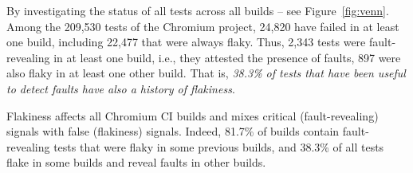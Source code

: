 By investigating the status of all tests across all builds -- see Figure~\ref{fig:venn}. Among the 209,530 tests of the Chromium project, 24,820 have failed in at least one build, including 22,477 that were always flaky. Thus, 2,343 tests were fault-revealing in at least one build, i.e., they attested the presence of faults, 897 were also flaky in at least one other build. That is, \emph{38.3\% of tests that have been useful to detect faults have also a history of flakiness}.


\begin{tcolorbox}[
    left=2pt,right=2pt,top=2pt,bottom=2pt, %
    arc=0pt, %
    boxrule=1.2pt %
]
Flakiness affects all Chromium CI builds and mixes critical (fault-revealing) signals with false (flakiness) signals. Indeed, 81.7\% of builds contain fault-revealing tests that were flaky in some previous builds, and 38.3\% of all tests flake in some builds and reveal faults in other builds. 
\end{tcolorbox}